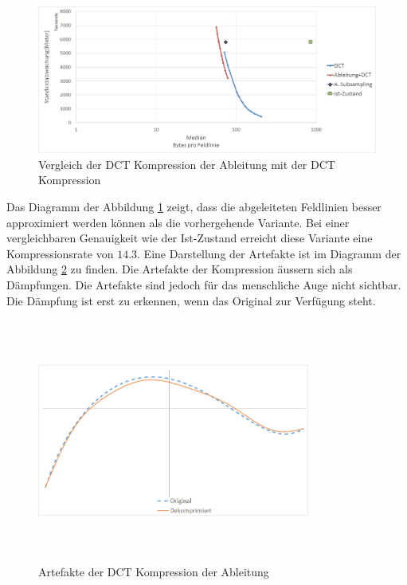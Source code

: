 \begin{figure}[!htbp]
	\center
	\includegraphics[width=1\textwidth,keepaspectratio]{./pictures/resultate/loesung1/loesung1-1/loesung1_1.png}
	\caption{Vergleich der DCT Kompression der Ableitung mit der DCT Kompression}
	\label{resultate:loesung1:dct_ableitung:resultate}
\end{figure}
Das Diagramm der Abbildung \ref{resultate:loesung1:dct_ableitung:resultate} zeigt, dass die abgeleiteten Feldlinien besser approximiert werden können als die vorhergehende Variante. Bei einer vergleichbaren Genauigkeit wie der Ist-Zustand erreicht diese Variante eine Kompressionsrate von $14.3$. Eine Darstellung der Artefakte ist im Diagramm der Abbildung \ref{resultate:loesung1:dct:byte:artefakte} zu finden. Die Artefakte der Kompression äussern sich als Dämpfungen. Die Artefakte sind jedoch für das menschliche Auge nicht sichtbar. Die Dämpfung ist erst zu erkennen, wenn das Original zur Verfügung steht.

\begin{figure}[!htbp]
	\center
	\includegraphics[width=0.8\textwidth,height=8cm,keepaspectratio]{./pictures/resultate/loesung1/loesung1-6/artefakte.png}
	\caption{Artefakte der DCT Kompression der Ableitung}
	\label{resultate:loesung1:dct:byte:artefakte}
\end{figure} 

